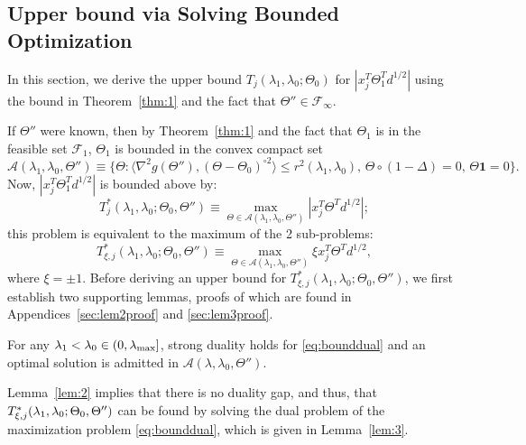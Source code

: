 \subsection{Upper bound via Solving Bounded Optimization}

In this section, we derive the upper bound $T_j(\lambda_1,\lambda_0;\Theta_{0})$ for $|x_j^T\Theta^T_{1}d^{1/2}|$ using the bound in Theorem~\ref{thm:1} and the fact that $\Theta''\in\mathcal{F}_{\infty}$.

If $\Theta''$ were known, then by Theorem~\ref{thm:1} and the fact that $\Theta_{1}$ is in the feasible set $\mathcal{F}_{1}$, $\Theta_{1}$ is bounded in the convex compact set
 \begin{equation}
     \mathcal{A}(\lambda_1,{\lambda_0},\Theta'')\equiv\{\Theta:\langle\nabla^2 g(\Theta''),(\Theta-\Theta_{0})^{\circ 2}\rangle\leq r^2(\lambda_1,\lambda_0),\,\Theta\circ(1-\Delta)=0,\, \Theta\mathbf{1}=0\}.
 \end{equation}
Now, $|x_j^T\Theta^T_{1}d^{1/2}|$ is bounded above by:
\begin{equation}
    T^*_{j}(\lambda_1,\lambda_0;\Theta_{0},\Theta'')\equiv\max_{\Theta\in\mathcal{A}(\lambda_1,{\lambda_0},\Theta'')} |x_j^T\Theta^T d^{1/2}|;
\end{equation}
this problem is equivalent to the maximum of the 2 sub-problems:
\begin{equation}
    \label{eq:bounddual}
    T^*_{\xi,j}(\lambda_1,\lambda_0;\Theta_{0},\Theta'')\equiv\max_{\Theta\in\mathcal{A}(\lambda_1,\lambda_0,\Theta'')} \xi x_j^T\Theta^T d^{1/2},
\end{equation}
where $\xi = \pm 1$. Before deriving an upper bound for $T^*_{\xi,j}(\lambda_1,\lambda_0;\Theta_{0},\Theta'')$, we first establish two supporting lemmas, proofs of which are found in Appendices~\ref{sec:lem2proof} and \ref{sec:lem3proof}.

\begin{lemma}
    \label{lem:2}
    For any $\lambda_1<\lambda_{0}\in (0,\lambda_\textnormal{max}]$, strong duality holds for \eqref{eq:bounddual} and an optimal solution is admitted in $\mathcal{A}(\lambda,{\lambda_0},\Theta'')$.
\end{lemma}

Lemma~\ref{lem:2} implies that there is no duality gap, and thus, that $\\T^*_{\xi,j}(\lambda_1,\lambda_0;\Theta_{0},\Theta'')$ can be found by solving the dual problem of the maximization problem \eqref{eq:bounddual}, which is given in Lemma~\ref{lem:3}.

